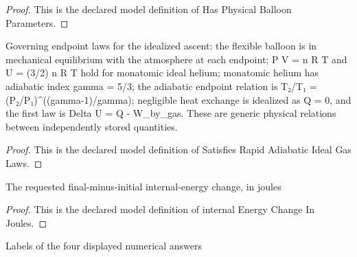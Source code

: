 \begin{proof}
  This is the declared model definition of Has Physical Balloon Parameters.
\end{proof}
\begin{definition}
  \label{def:physics:phyx-mini-0345:phyxminiproblems-problemphyxmini0345-satisfiesrapidadiabaticidealgaslaws}
  Governing endpoint laws for the idealized ascent: the flexible balloon is in mechanical equilibrium with the atmosphere at each endpoint; P V = n R T and U = (3/2) n R T hold for monatomic ideal helium; monatomic helium has adiabatic index gamma = 5/3; the adiabatic endpoint relation is T₂/T₁ = (P₂/P₁)\textasciicircum{}((gamma-1)/gamma); negligible heat exchange is idealized as Q = 0, and the first law is Delta U = Q - W\_by\_gas. These are generic physical relations between independently stored quantities.
\end{definition}
\begin{proof}
  This is the declared model definition of Satisfies Rapid Adiabatic Ideal Gas Laws.
\end{proof}
\begin{definition}
  \label{def:physics:phyx-mini-0345:phyxminiproblems-problemphyxmini0345-internalenergychangeinjoules}
  The requested final-minus-initial internal-energy change, in joules
\end{definition}
\begin{proof}
  This is the declared model definition of internal Energy Change In Joules.
\end{proof}
\begin{definition}
  \label{def:physics:phyx-mini-0345:phyxminiproblems-problemphyxmini0345-answerchoice}
  Labels of the four displayed numerical answers
\end{definition}
